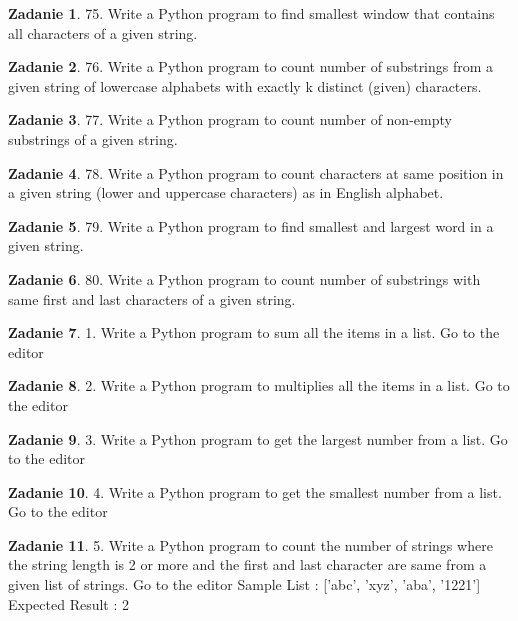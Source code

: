\documentclass[11pt]{article}
\theoremstyle{definition}
\newtheorem{zadanie}{Zadanie}
\begin{document}
\begin{zadanie}
75. Write a Python program to find smallest window that contains all characters of a given string.
\end{zadanie}

\begin{zadanie}
76. Write a Python program to count number of substrings from a given string of lowercase alphabets with exactly k distinct (given) characters.
\end{zadanie}

\begin{zadanie}
77. Write a Python program to count number of non-empty substrings of a given string.
\end{zadanie}

\begin{zadanie}
78. Write a Python program to count characters at same position in a given string (lower and uppercase characters) as in English alphabet.
\end{zadanie}

\begin{zadanie}
79. Write a Python program to find smallest and largest word in a given string.
\end{zadanie}

\begin{zadanie}
80. Write a Python program to count number of substrings with same first and last characters of a given string.
\end{zadanie}
\begin{zadanie}
1. Write a Python program to sum all the items in a list. Go to the editor
\end{zadanie}

\begin{zadanie}
2. Write a Python program to multiplies all the items in a list. Go to the editor
\end{zadanie}

\begin{zadanie}
3. Write a Python program to get the largest number from a list. Go to the editor
\end{zadanie}

\begin{zadanie}
4. Write a Python program to get the smallest number from a list. Go to the editor
\end{zadanie}

\begin{zadanie}
5. Write a Python program to count the number of strings where the string length is 2 or more and the first and last character are same from a given list of strings. Go to the editor
Sample List : ['abc', 'xyz', 'aba', '1221']
Expected Result : 2
\end{zadanie}
\end{document}
